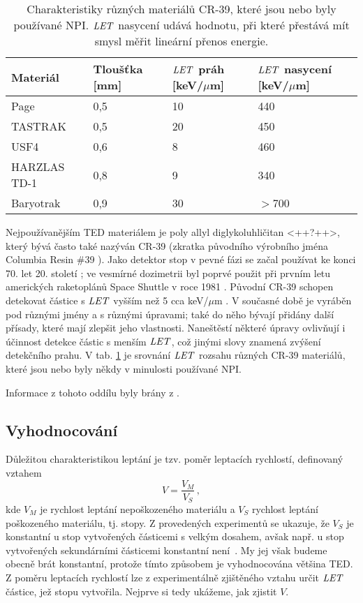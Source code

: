 \begin{table}[ht]
  \centering
  \caption{Charakteristiky různých materiálů CR-39, které jsou nebo byly používané NPI. $\mathit{LET}$ nasycení udává hodnotu, při které přestává mít smysl měřit lineární přenos energie. \cite{thesisKPBrabcova}}
  \label{tab:detektory_PADC_types}
  \begin{tabular}{llll}
	\toprule
	Materiál&Tloušťka [mm]&$\mathit{LET}$ práh [keV/$\mu$m]&$\mathit{LET}$ nasycení [keV/$\mu$m]\\
	\midrule
	Page&0,5&10&440\\
	TASTRAK&0,5&20&450\\
	USF4&0,6&8&460\\
	HARZLAS TD-1&0,8&9&340\\
	Baryotrak&0,9&30&$>$700\\ 
	\bottomrule
  \end{tabular}
\end{table}
Nejpoužívanějším TED materiálem je poly allyl diglykoluhličitan <++?++>, který bývá často také nazýván CR-39 (zkratka původního výrobního jména Columbia Resin \#39 \cite{CR39_wiki}). Jako detektor stop v pevné fázi se začal používat ke konci 70. let 20. století \cite{thesisKPBrabcova}; ve vesmírné dozimetrii byl poprvé použit při prvním letu amerických raketoplánů Space Shuttle v roce 1981 \cite{benton}. Původní CR-39 schopen detekovat částice s $\mathit{LET}$ vyšším než 5 cca keV/$\mu$m \cite{benton}. V současné době je vyráběn pod různými jmény a s různými úpravami; také do něho bývají přidány další přísady, které mají zlepšit jeho vlastnosti. Naneštěstí některé úpravy ovlivňují i účinnost detekce částic s menším $\mathit{LET}$, což jinými slovy znamená zvýšení detekčního prahu. V tab. \ref{tab:detektory_PADC_types} je srovnání
$\mathit{LET}$ rozsahu různých CR-39 materiálů, které jsou nebo byly někdy v minulosti používané NPI.

Informace z tohoto oddílu byly brány z \cite{thesisKPBrabcova}.
\subsection{Vyhodnocování}
Důležitou charakteristikou leptání je tzv. poměr leptacích rychlostí, definovaný vztahem
\begin{equation}
  V=\frac{V_M}{V_S}\,,
  \label{eq:pomerLepRychlostiDEF}
\end{equation}
kde $V_M$ je rychlost leptání nepoškozeného materiálu a $V_S$ rychlost leptání poškozeného materiálu, tj. stopy. Z provedených experimentů se ukazuje, že $V_S$ je konstantní u stop vytvořených částicemi s velkým dosahem, avšak např. u stop vytvořených sekundárními částicemi konstantní není~\cite{ssntd}. My jej však budeme obecně brát konstantní, protože tímto způsobem je vyhodnocována většina TED. Z poměru leptacích rychlostí lze z experimentálně zjištěného vztahu určit $\mathit{LET}$ částice, jež stopu vytvořila. Nejprve si tedy ukážeme, jak zjistit $V$.

